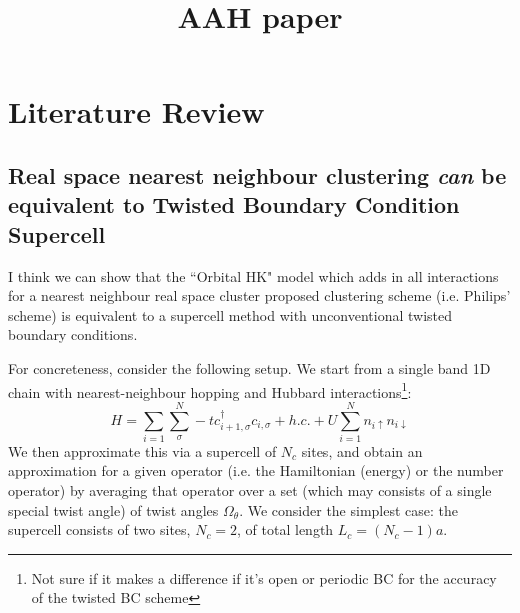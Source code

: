 \documentclass[12pt]{article}
\title{AAH paper} %
\numberwithin{equation}{section}
\begin{document}
\maketitle
\tableofcontents


\section{Literature Review}
\subsection{Real space nearest neighbour clustering \textit{can} be equivalent to Twisted Boundary Condition Supercell}
I think we can show that the ``Orbital HK" model which adds in all interactions for a nearest neighbour real space cluster   proposed clustering scheme (i.e. Philips' scheme) is equivalent to a supercell method with unconventional twisted boundary conditions.

For concreteness, consider the following setup. We start from a single band 1D chain with nearest-neighbour hopping and Hubbard interactions\footnote{Not sure if it makes a difference if it's open or periodic BC for the accuracy of the twisted BC scheme}:
\begin{equation}
    H=\sum_{i=1}\sum_{\sigma}^{N}-tc^\dagger_{i+1,\sigma}c_{i,\sigma}+h.c.+U\sum_{i=1}^{N}n_{i\uparrow}n_{i\downarrow}
\end{equation}
We then approximate this via a supercell of $N_c$ sites, and obtain an approximation for a given operator (i.e. the Hamiltonian (energy) or the number operator) by averaging that operator over a set (which may consists of a single special twist angle) of twist angles $\Omega_\theta$. We consider the simplest case: the supercell consists of two sites, $N_c=2$, of total length $L_c=(N_c-1) a$. 
\end{document}
